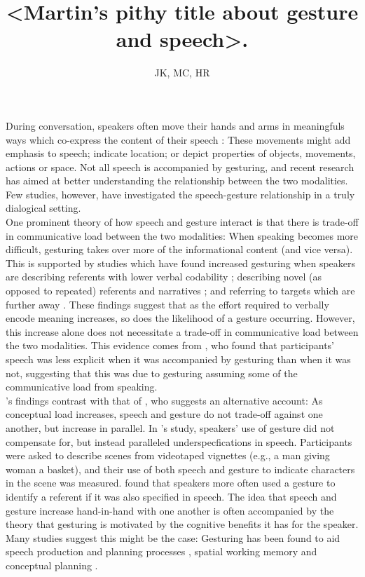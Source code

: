 \documentclass[a4paper,man,natbib]{apa6}
\title{<Martin's pithy title about gesture and speech>.}
\author{JK, MC, HR}
\affiliation{Psychology, PPLS, University of Edinburgh}
\begin{document}
\maketitle


\noindent
During conversation, speakers often move their hands and arms in meaningfuls ways which co-express the content of their speech \citep{McNeill1992}:
These movements might add emphasis to speech; indicate location; or depict properties of objects, movements, actions or space.
Not all speech is accompanied by gesturing, and recent research has aimed at better understanding the relationship between the two modalities.
Few studies, however, have investigated the speech-gesture relationship in a truly dialogical setting.\\

One prominent theory of how speech and gesture interact \citep{Bangerter2004, DeRuiter2006} is that there is trade-off in communicative load between the two modalities:
When speaking becomes more difficult, gesturing takes over more of the informational content (and vice versa).
This is supported by studies which have found increased gesturing when speakers are describing referents with lower verbal codability \citep{Morsella2004}; describing novel (as opposed to repeated) referents and narratives \citep{Hoetjes2015, Jacobs2007}; and referring to targets which are further away \citep{Bangerter2004}.
These findings suggest that as the effort required to verbally encode meaning increases, so does the likelihood of a gesture occurring.
However, this increase alone does not necessitate a trade-off in communicative load between the two modalities.
This evidence comes from \citet{Melinger2004}, who found that participants' speech was less explicit when it was accompanied by gesturing than when it was not, suggesting that this was due to gesturing assuming some of the communicative load from speaking.\\

\citeauthor{Melinger2004}'s findings contrast with that of \citep{So2009}, who suggests an alternative account:
As conceptual load increases, speech and gesture do not trade-off against one another, but increase in parallel.
In \citeauthor{So2009}'s study, speakers' use of gesture did not compensate for, but instead paralleled underspecfications in speech.
Participants were asked to describe scenes from videotaped vignettes (e.g., a man giving woman a basket), and their use of both speech and gesture to indicate characters in the scene was measured.
\citeauthor{So2009} found that speakers more often used a gesture to identify a referent if it was also specified in speech. 
The idea that speech and gesture increase hand-in-hand with one another is often accompanied by the theory that gesturing is motivated by the cognitive benefits it has for the speaker. 
Many studies suggest this might be the case: Gesturing has been found to aid speech production and planning processes \citep{Rauscher1996, Krauss1999, Rose2001, Morsella2004, Kita2000}, spatial working memory \citep{Wesp2001, Morsella2004} and conceptual planning \citep{Melinger2007}.\\
\end{document}
